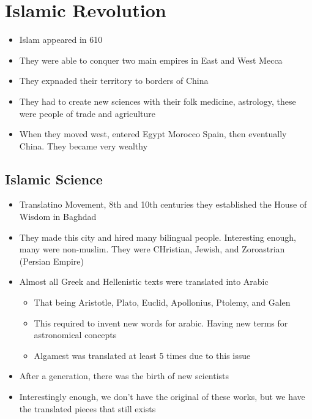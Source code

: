 \documentclass{article}
\begin{document}
\section{Islamic Revolution}

\begin{itemize}
  \item Islam appeared in 610
  \item They were able to conquer two main empires in East and West Mecca
  \item They expnaded their territory to borders of China
  \item They had to create new sciences with their folk medicine, astrology,
    these were people of trade and agriculture
  \item When they moved west, entered Egypt \rightarrow{} Morocco \rightarrow{} Spain, then eventually
    China. They became very wealthy
\end{itemize}

\subsection{Islamic Science}
\begin{itemize}
  \item Translatino Movement, 8th and 10th centuries
    they established the House of Wisdom in Baghdad
  \item They made this city and hired many bilingual people.
    Interesting enough, many were non-muslim. They were CHristian, Jewish, and Zoroastrian (Persian Empire)
  \item Almost all Greek and Hellenistic texts were translated into Arabic
    \begin{itemize}
      \item That being Aristotle, Plato, Euclid, Apollonius, Ptolemy, and Galen
      \item This required to invent new words for arabic. Having new terms
        for astronomical concepts
      \item Algamest was translated at least 5 times due to this issue
    \end{itemize}
  \item After a generation, there was the birth of new scientists
  \item Interestingly enough, we don't have the original of these works,
    but we have the translated pieces that still exists
\end{itemize}
\end{document}
